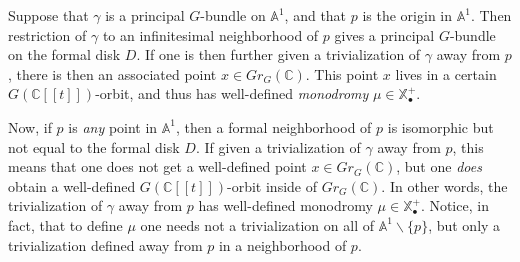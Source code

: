 \begin{rmk} \label{rem:monodromy}
Suppose that $\gamma$ is a principal $G$-bundle on $\mathbb{A}^1$, and that $p$ is the origin in $\mathbb{A}^1$.  Then restriction of $\gamma$ to an infinitesimal neighborhood of $p$ gives a principal $G$-bundle on the formal disk $D$.  If one is then further given a trivialization of $\gamma$ away from $p$, there is then an associated point $x \in Gr_{G}(\mathbb{C})$.  This point $x$ lives in a certain $G(\mathbb{C}[[t]])$-orbit, and thus has well-defined \textit{monodromy} $\mu \in \mathbb{X}_{\bullet}^+$.

Now, if $p$ is \textit{any} point in $\mathbb{A}^1$, then a formal neighborhood of $p$ is isomorphic but not equal to the formal disk $D$.  If given a trivialization of $\gamma$ away from $p$, this means that one does not get a well-defined point $x \in Gr_{G}(\mathbb{C})$, but one \textit{does} obtain a well-defined $G(\mathbb{C}[[t]])$-orbit inside of $Gr_{G}(\mathbb{C})$.  In other words, the trivialization of $\gamma$ away from $p$ has well-defined monodromy $\mu \in \mathbb{X}_{\bullet}^+$.  Notice, in fact, that to define $\mu$ one needs not a trivialization on all of $\mathbb{A}^1 \backslash \{ p \}$, but only a trivialization defined away from $p$ in a neighborhood of $p$.
\end{rmk}




